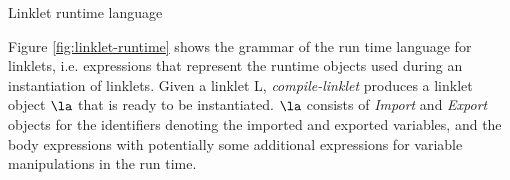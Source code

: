 		\begin{figure-here}
			\begin{todo}
				Linklet runtime language
			\end{todo}


		\end{figure-here}


		\begin{paragraph-here}
			Figure \ref{fig:linklet-runtime} shows the grammar of the run\dash
			time language for linklets, i.e. expressions that represent the
			run\dash time objects used during an instantiation of linklets. Given a
			linklet L, \emph{compile-linklet} produces a linklet object $\la$ that
			is ready to be instantiated. $\la$ consists of \emph{Import} and
			\emph{Export} objects for the identifiers denoting the imported and
			exported variables, and the body expressions with potentially some
			additional expressions for variable manipulations in the run\dash
			time.
		\end{paragraph-here}


